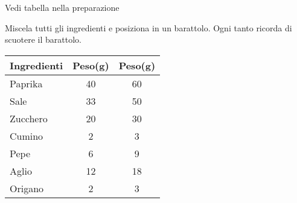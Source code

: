 \label{rub:magic-dust}
\serves{-}
\cooktime[Cottura]{-}
\vegetarian
\begin{ingreds}
	Vedi tabella nella preparazione

\end{ingreds}

\begin{method}
Miscela tutti gli ingredienti e posiziona in un barattolo. Ogni tanto ricorda di scuotere il barattolo.
\begin{table}[h]
\begin{tabular}{lcc}
\toprule
	Ingredienti	&	Peso(g)	&	Peso(g)\\
\midrule
	Paprika		&	40	&	60	\\
	Sale		&	33	&	50	\\
	Zucchero	&	20	&	30	\\
	Cumino		&	2	&	3	\\
	Pepe		&	6	&	9	\\
	Aglio		&	12	&	18	\\
	Origano		&	2	&	3	\\
\bottomrule
\end{tabular}
\end{table}
\end{method}



